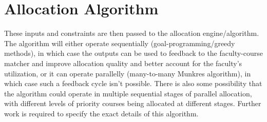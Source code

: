 \section{Allocation Algorithm}

These inputs and constraints are then passed to the allocation engine/algorithm. The algorithm will either operate sequentially (goal-programming/greedy methods), in which case the outputs can be used to feedback to the faculty-course matcher and improve allocation quality and better account for the faculty's utilization, or it can operate parallelly (many-to-many Munkres algorithm), in which case such a feedback cycle isn't possible. There is also some possibility that the algorithm could operate in multiple sequential stages of parallel allocation, with different levels of priority courses being allocated at different stages. Further work is required to specify the exact details of this algorithm.